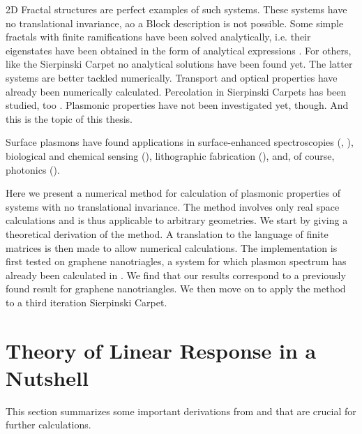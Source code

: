 \documentclass[a4paper,12pt]{article}
\begin{document}
    2D Fractal structures  are perfect examples of such systems. These systems have no translational invariance, ao a Block description is not possible. Some simple fractals with finite ramifications  have been solved analytically, i.e. their eigenstates have been obtained in the form of analytical expressions \cite{kadanoff1983}. For others, like the Sierpinski Carpet  no analytical solutions have been found yet. The latter systems are better tackled numerically. Transport \cite{transport2016} and optical \cite{optics2017} properties have already been numerically calculated. Percolation in Sierpinski Carpets has been studied, too \cite{percolation1996}. Plasmonic  properties have not been investigated yet, though. And this is the topic of this thesis.

    Surface plasmons  have found applications in surface-enhanced spectroscopies (\cite{raman2005}, \cite{second-harmonic1994}),  biological and chemical sensing (\cite{towards2005}), lithographic fabrication (\cite{nanolithography2004}), and, of course, photonics (\cite{brongersma2007surface}).

    Here we present a numerical method for calculation of plasmonic properties of systems with no translational invariance. The method involves only real space calculations and is thus applicable to arbitrary geometries. We start by giving a theoretical derivation of the method. A translation to the language of finite matrices is then made to allow numerical calculations. The implementation is first tested on graphene nanotriagles, a system for which plasmon spectrum has already been calculated in \cite{plasmonic2015}. We find that our results correspond to a previously found result for graphene nanotriangles. We then move on to apply the method to a third iteration Sierpinski Carpet. 


\newpage
\section{Theory of Linear Response in a Nutshell} \label{sec:linear_response}
    This section summarizes some important derivations from \cite{vonsovskiui1989quantum} and \cite{giuliani2005quantum} that are crucial for further calculations.
\end{document}
